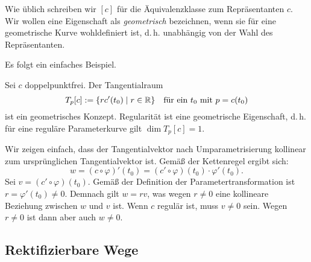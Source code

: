 \noindent
Wie üblich schreiben wir $[c]$ für die Äquivalenzklasse zum
Repräsentanten $c$. Wir wollen eine Eigenschaft als
\emph{geometrisch} bezeichnen, wenn sie für eine geometrische Kurve
wohldefiniert ist, d.\,h. unabhängig von der Wahl des Repräsentanten.

Es folgt ein einfaches Beispiel.

\begin{corollary}
Sei $c$ doppelpunktfrei. Der Tangentialraum
\begin{equation}
T_p[c] := \{rc'(t_0)\mid r\in\mathbb R\}
\quad\text{für ein $t_0$ mit $p=c(t_0)$}
\end{equation}
ist ein geometrisches Konzept. Regularität ist eine geometrische
Eigenschaft, d.\,h. für eine reguläre Parameterkurve gilt
$\dim T_p[c]=1$.
\end{corollary}

\noindent{}
Wir zeigen einfach, dass der Tangentialvektor nach Umparametrisierung
kollinear zum ursprünglichen Tangentialvektor ist. Gemäß der
Kettenregel ergibt sich:%
\begin{equation}
w = (c\circ\varphi)'(t_0) = (c'\circ\varphi)(t_0)\cdot \varphi'(t_0).
\end{equation}
Sei $v=(c'\circ\varphi)(t_0)$. Gemäß der Definition der
Parametertransformation ist $r=\varphi'(t_0)\ne 0$. Demnach
gilt $w=rv$, was wegen $r\ne 0$ eine kollineare Beziehung zwischen
$w$ und $v$ ist. Wenn $c$ regulär ist, muss $v\ne 0$ sein.
Wegen $r\ne 0$ ist dann aber auch $w\ne 0$.\;\qedsymbol


\subsection{Rektifizierbare Wege}

